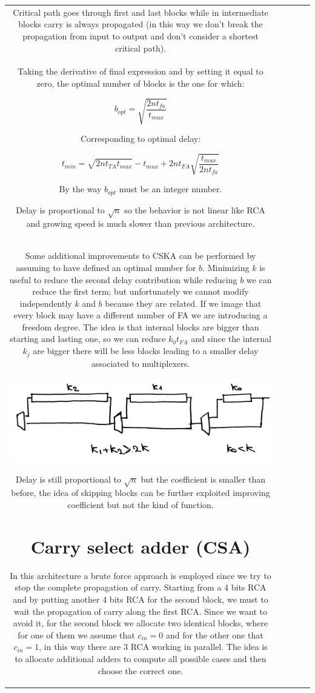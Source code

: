 \begin{center}
\begin{tabular}{|c|c|c|c|c|}
Critical path goes through first and last blocks while in intermediate blocks carry is always propagated (in this way we don't break the propagation from input to output and don't consider a shortest critical path).\\
Taking the derivative of final expression and by setting it equal to zero, the optimal number of blocks is the one for which:

$$b_{opt}=\sqrt{\frac{2nt_{fa}}{t_{mux}}}$$

Corresponding to optimal delay:

$$t_{min}=\sqrt{2nt_{TA}t_{mux}}-t_{mux}+2nt_{FA} \sqrt{\frac{t_{mux}}{2nt_{fa}}}$$

By the way $b_{opt}$ must be an integer number.

Delay is proportional to $\sqrt{n}$ so the behavior is not linear like RCA and growing speed is much slower than previous architecture.\\

Some additional improvements to CSKA can be performed by assuming to have defined an optimal number for $b$. Minimizing $k$ is useful to reduce the second delay contribution while reducing $b$ we can reduce the first term; but unfortunately we cannot modify independently $k$ and $b$ because they are related. If we image that every block may have a different number of FA we are introducing a freedom degree. The idea is that internal blocks are bigger than starting and lasting one, so we can reduce $k_0t_{FA}$ and since the internal $k_j$ are bigger there will be less blocks leading to a smaller delay associated to multiplexers.
\begin{center}
  \includegraphics[width=0.7\linewidth]{img/img2/6}
\end{center}


Delay is still proportional to $\sqrt{n}$ but the coefficient is smaller than before, the idea of skipping blocks can be further exploited improving coefficient but not the kind of function.

 \section{Carry select adder (CSA)}
 In this architecture a brute force approach is employed since we try to stop the complete propagation of carry. Starting from a 4 bits RCA and by putting another 4 bits RCA for the second block, we must to wait the propagation of carry along the first RCA. Since we want to avoid it, for the second block we allocate two identical blocks, where for one of them we assume that $c_{in}=0$ and for the other one that $c_{in}=1$, in this way there are 3 RCA working in parallel. The idea is to allocate additional adders to compute all possible cases and then choose the correct one.


\end{tabular}
\end{center}
